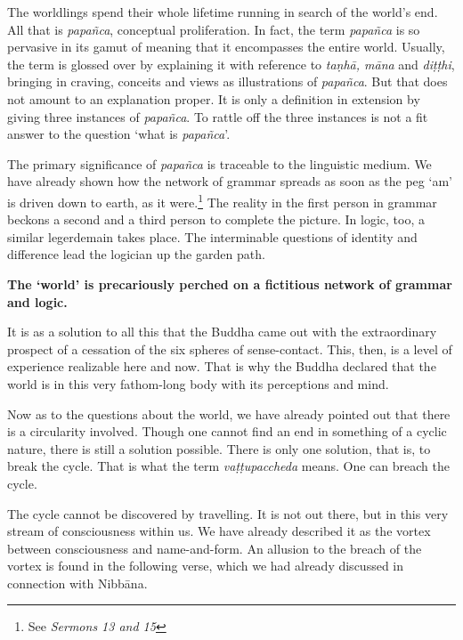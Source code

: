 The worldlings spend their whole lifetime running in search of the world's end. All that is \emph{papañca}, conceptual proliferation. In fact, the term \emph{papañca} is so pervasive in its gamut of meaning that it encompasses the entire world. Usually, the term is glossed over by explaining it with reference to \emph{taṇhā, māna} and \emph{diṭṭhi}, bringing in craving, conceits and views as illustrations of \emph{papañca}. But that does not amount to an explanation proper. It is only a definition in extension by giving three instances of \emph{papañca}. To rattle off the three instances is not a fit answer to the question `what is \emph{papañca}'.

The primary significance of \emph{papañca} is traceable to the linguistic medium. We have already shown how the network of grammar spreads as soon as the peg `am' is driven down to earth, as it were.\footnote{See \emph{Sermons 13 and 15}} The reality in the first person in grammar beckons a second and a third person to complete the picture. In logic, too, a similar legerdemain takes place. The interminable questions of identity and difference lead the logician up the garden path.

\textbf{The `world' is precariously perched on a fictitious network of grammar and logic.}

It is as a solution to all this that the Buddha came out with the extraordinary prospect of a cessation of the six spheres of sense-contact. This, then, is a level of experience realizable here and now. That is why the Buddha declared that the world is in this very fathom-long body with its perceptions and mind.

Now as to the questions about the world, we have already pointed out that there is a circularity involved. Though one cannot find an end in something of a cyclic nature, there is still a solution possible. There is only one solution, that is, to break the cycle. That is what the term \emph{vaṭṭupaccheda} means. One can breach the cycle.

\enlargethispage{\baselineskip}

The cycle cannot be discovered by travelling. It is not out there, but in this very stream of consciousness within us. We have already described it as the vortex between consciousness and name-and-form. An allusion to the breach of the vortex is found in the following verse, which we had already discussed in connection with Nibbāna.

